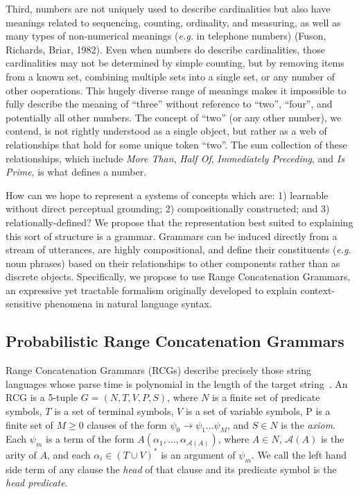 \documentclass[10pt,letterpaper]{article}
\begin{document}
Third, numbers are not uniquely used to describe cardinalities but
also have meanings related to sequencing, counting, ordinality, and
measuring, as well as many types of non-numerical meanings ({\it e.g.}
in telephone numbers) (Fuson, Richards, Briar, 1982). Even when
numbers do describe cardinalities, those cardinalities may not be
determined by simple counting, but by removing items from a known set,
combining multiple sets into a single set, or any number of other
ooperations. This hugely diverse range of meanings makes it impossible
to fully describe the meaning of ``three'' without reference to
``two'', ``four'', and potentially all other numbers. The concept of
``two'' (or any other number), we contend, is not rightly understood
as a single object, but rather as a web of relationships that hold for
some unique token ``two''. The sum collection of these relationships,
which include \emph{More Than}, \emph{Half Of}, \emph{Immediately Preceding},
and \emph{Is Prime}, is what defines a number.

How can we hope to represent a systems of concepts which are: 1)
learnable without direct perceptual grounding; 2) compositionally
constructed; and 3) relationally-defined? We propose that the
representation best suited to explaining this sort of structure is a
grammar. Grammars can be induced directly from a stream of utterances,
are highly compositional, and define their constituents ({\it e.g.}
noun phrases) based on their relationships to other components rather
than as discrete objects. Specifically, we propose to use Range
Concatenation Grammars, an expressive yet tractable formalism
originally developed to explain context-sensitive phenomena in natural
language syntax.

\subsection{Probabilistic Range Concatenation Grammars}

Range Concatenation Grammars (RCGs) describe precisely those string
languages whose parse time is polynomial in the length of the target
string~\citep{boullier2005range}. An RCG is a 5-tuple $G=(N, T, V, P, S)$, where $N$ is a finite set of predicate symbols, $T$ is a set
of terminal symbols, $V$ is a set of variable symbols, P is a finite
set of $M \geq 0$ clauses of the form $\psi_0 \rightarrow \psi_1 \dots
\psi_M$, and $S \in N$ is the \emph{axiom}. Each $\psi_m$ is a term of
the form $A(\alpha_1, \dots, \alpha_{\mathcal{A}(A)})$, where $A \in
N$, $\mathcal{A}(A)$ is the arity of $A$, and each $\alpha_i \in (T
\cup V)^*$ is an argument of $\psi_m$. We call the left hand side term
of any clause the \emph{head} of that clause and its predicate symbol
is the \emph{head predicate}.
\end{document}
